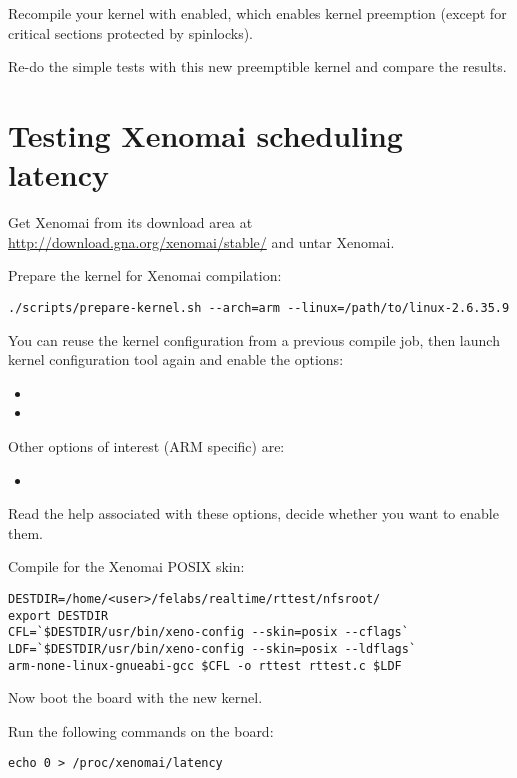 Recompile your kernel with  enabled, which
enables kernel preemption (except for critical sections protected by
spinlocks).

Re-do the simple tests with this new preemptible kernel and compare
the results.

\section{Testing Xenomai scheduling latency}

Get Xenomai from its download area at
\url{http://download.gna.org/xenomai/stable/} and untar Xenomai.

Prepare the kernel for Xenomai compilation:
\begin{verbatim}
./scripts/prepare-kernel.sh --arch=arm --linux=/path/to/linux-2.6.35.9
\end{verbatim}

You can reuse the kernel configuration from a previous compile job,
then launch kernel configuration tool again and enable the options:
\begin{itemize}
\item {}
\item {}
\end{itemize}

Other options of interest (ARM specific) are:
\begin{itemize}
\item {}
\end{itemize}

Read the help associated with these options, decide whether you want
to enable them.

Compile  for the Xenomai POSIX skin:

\begin{verbatim}
DESTDIR=/home/<user>/felabs/realtime/rttest/nfsroot/
export DESTDIR
CFL=`$DESTDIR/usr/bin/xeno-config --skin=posix --cflags`
LDF=`$DESTDIR/usr/bin/xeno-config --skin=posix --ldflags`
arm-none-linux-gnueabi-gcc $CFL -o rttest rttest.c $LDF
\end{verbatim}

Now boot the board with the new kernel.

Run the following commands on the board:

\begin{verbatim}
echo 0 > /proc/xenomai/latency
\end{verbatim}

